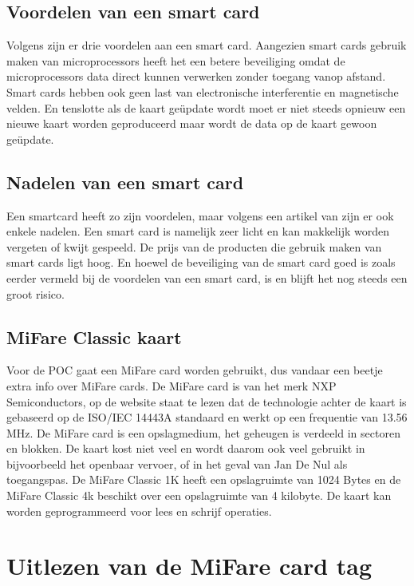 \subsection{Voordelen van een smart card}
Volgens \textcite{SwatiTawdeSmartCard} zijn er drie voordelen aan een smart card. Aangezien smart cards gebruik maken van microprocessors heeft het een betere beveiliging omdat de microprocessors data direct kunnen verwerken zonder toegang vanop afstand. Smart cards hebben ook geen last van electronische interferentie en magnetische velden. En tenslotte als de kaart geüpdate wordt moet er niet steeds opnieuw een nieuwe kaart worden geproduceerd maar wordt de data op de kaart gewoon geüpdate.

\subsection{Nadelen van een smart card}
Een smartcard heeft zo zijn voordelen, maar volgens een artikel van \textcite{SageSmartCard} zijn er ook enkele nadelen. Een smart card is namelijk zeer licht en kan makkelijk worden vergeten of kwijt gespeeld. De prijs van de producten die gebruik maken van smart cards ligt hoog. En hoewel de beveiliging van de smart card goed is zoals eerder vermeld bij de voordelen van een smart card, is en blijft het nog steeds een groot risico.

\subsection{MiFare Classic kaart}
Voor de POC gaat een MiFare card worden gebruikt, dus vandaar een beetje extra info over MiFare cards.
De MiFare card is van het merk NXP Semiconductors, op de \textcite{MiFareSmartCard} website staat te lezen dat de technologie achter de kaart is gebaseerd op de ISO/IEC 14443A standaard en werkt op een frequentie van 13.56 MHz. De MiFare card is een opslagmedium, het geheugen is verdeeld in sectoren en blokken. De kaart kost niet veel en wordt daarom ook veel gebruikt in bijvoorbeeld het openbaar vervoer, of in het geval van Jan De Nul als toegangspas.
De MiFare Classic 1K heeft een opslagruimte van 1024 Bytes en de MiFare Classic 4k beschikt over een opslagruimte van 4 kilobyte. De kaart kan worden geprogrammeerd voor lees en schrijf operaties.




\section{Uitlezen van de MiFare card tag}
